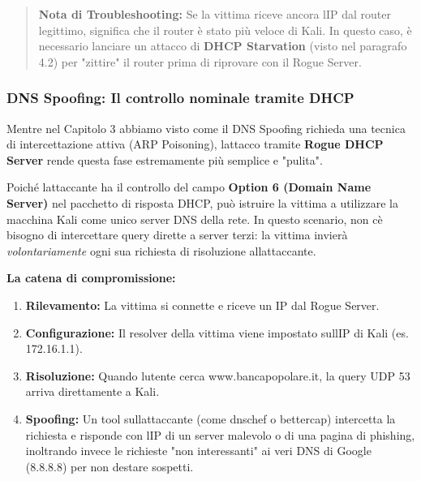 \documentclass[11pt,a4paper]{article}
\begin{document}
\begin{quote}
\textbf{Nota di Troubleshooting:} Se la vittima riceve ancora
l\textquotesingle IP dal router legittimo, significa che il router è
stato più veloce di Kali. In questo caso, è necessario lanciare un
attacco di \textbf{DHCP Starvation} (visto nel paragrafo 4.2) per
"zittire" il router prima di riprovare con il Rogue Server.
\end{quote}

\subsubsection{DNS Spoofing: Il controllo nominale tramite
DHCP}\label{dns-spoofing-il-controllo-nominale-tramite-dhcp}

Mentre nel Capitolo 3 abbiamo visto come il DNS Spoofing richieda una
tecnica di intercettazione attiva (ARP Poisoning),
l\textquotesingle attacco tramite \textbf{Rogue DHCP Server} rende
questa fase estremamente più semplice e "pulita".

Poiché l\textquotesingle attaccante ha il controllo del campo
\textbf{Option 6 (Domain Name Server)} nel pacchetto di risposta DHCP,
può istruire la vittima a utilizzare la macchina Kali come unico server
DNS della rete. In questo scenario, non c\textquotesingle è bisogno di
intercettare query dirette a server terzi: la vittima invierà
\emph{volontariamente} ogni sua richiesta di risoluzione
all\textquotesingle attaccante.

\textbf{La catena di compromissione:}

\begin{enumerate}
\def\labelenumi{\arabic{enumi}.}
\item
  \textbf{Rilevamento:} La vittima si connette e riceve un IP dal Rogue
  Server.
\item
  \textbf{Configurazione:} Il resolver della vittima viene impostato
  sull\textquotesingle IP di Kali (es. 172.16.1.1).
\item
  \textbf{Risoluzione:} Quando l\textquotesingle utente cerca
  www.bancapopolare.it, la query UDP 53 arriva direttamente a Kali.
\item
  \textbf{Spoofing:} Un tool sull\textquotesingle attaccante (come
  dnschef o bettercap) intercetta la richiesta e risponde con
  l\textquotesingle IP di un server malevolo o di una pagina di
  phishing, inoltrando invece le richieste "non interessanti" ai veri
  DNS di Google (8.8.8.8) per non destare sospetti.
\end{enumerate}
\end{document}
